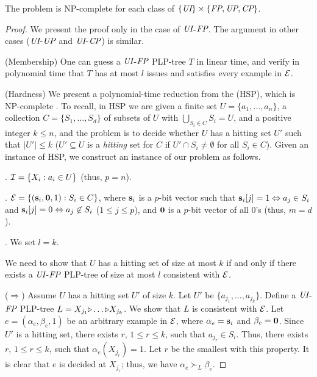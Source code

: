 \begin{thm}
\label{thm:UIFP_smallest_decision}
	The  problem is NP-complete for each class of $\{\textit{UI}\} \times \{\textit{FP},\textit{UP},\textit{CP}\}$.
\end{thm}
\begin{proof}
	We present the proof only in the case of $\textit{UI}$-$\textit{FP}$. The argument in other cases 
	($\textit{UI}$-$\textit{UP}$ and $\textit{UI}$-$\textit{CP}$) is similar.

	(Membership) One can guess a $\textit{UI}$-$\textit{FP}$ PLP-tree $T$ in linear time, and verify in polynomial time that 
	$T$ has at most $l$ issues and satisfies every example in $\mathcal{E}$.

	(Hardness) We present a polynomial-time reduction from the
	 (HSP), which is NP-complete 
    \cite{Garey:1979}. To recall, in HSP we are given a finite
		set $U=\{a_1,\ldots,a_n\}$, a collection $C=\{S_1,\ldots,
    S_d\}$ of subsets of $U$ with $\bigcup_{S_i \in C} S_i = U$,
    and a positive integer $k \leq n$, and the problem is to
    decide whether $U$ has a hitting set $U'$ such that $|U'|\leq k$ 
    ($U'\subseteq U$ is a \emph{hitting} set for $C$ if 
		$U' \cap S_i \not = \emptyset$ for all $S_i \in C$).
	Given an instance of HSP, we construct an instance of our problem as follows.

	. $\mathcal{I}=\{X_i: a_i \in U\}$ (thus, $p=n$).

	. $\mathcal{E}=\{(\textbf{s}_i, \textbf{0},1): S_i \in C\}$, where
	$\textbf{s}_i$ is a $p$-bit vector such that $\textbf{s}_i[j]=1 \Leftrightarrow a_j \in S_i$
	and $\textbf{s}_i[j]=0 \Leftrightarrow a_j \not \in S_i$ ($1 \leq j \leq p$), 
	and $\textbf{0}$ is a $p$-bit vector of all $0$'s (thus, $m=d$).

	. We set $l=k$.

	We need to show that $U$ has a hitting set of size at most $k$ if and only if
	there exists a $\textit{UI}$-$\textit{FP}$ PLP-tree of size at most $l$ consistent with $\mathcal{E}$.

\smallskip
\noindent
	($\Rightarrow$) Assume $U$ has a hitting set $U'$ of size $k$.
	Let $U'$ be $\{a_{j_1},\ldots,a_{j_k}\}$.
	Define a $\textit{UI}$-$\textit{FP}$ PLP-tree $L=X_{j_1} \mathit{\triangleright} \ldots \mathit{\triangleright} X_{j_k}$.
	We show that $L$ is consistent with $\mathcal{E}$.
	Let $e=(\alpha_e,\beta_e,1)$ be an arbitrary example in $\mathcal{E}$, where
	$\alpha_e=\textbf{s}_i$ and $\beta_e=\textbf{0}$.
	Since $U'$ is a hitting set, %
        there exists $r$, $1 \leq r \leq k$, 
        such that $a_{j_r} \in S_i$.
	Thus, %
        there exists $r$, $1 \leq r \leq k$, %
	such that $\alpha_e(X_{j_r})=1$.
	Let $r$ be the smallest with this property. 
	It is clear that $e$ is decided at $X_{j_r}$; thus, we have 
	$\alpha_e \succ_L \beta_e$.


\end{proof}
